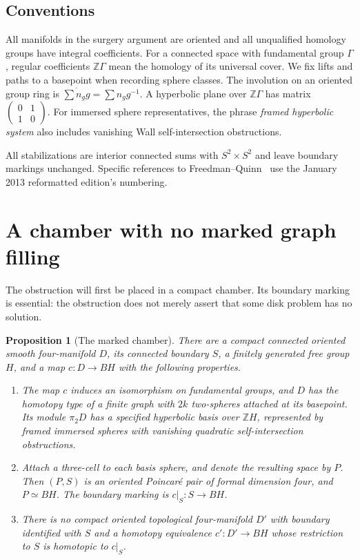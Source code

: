 \documentclass[11pt]{article}
\newtheorem{proposition}[theorem]{Proposition}
\theoremstyle{definition}
\theoremstyle{remark}
\newcommand{\Z}{\mathbb Z}
\begin{document}
\subsection{Conventions}
All manifolds in the surgery argument are oriented and all unqualified
homology groups have integral coefficients. For a connected space with
fundamental group $\Gamma$, regular coefficients $\Z\Gamma$ mean the
homology of its universal cover. We fix lifts and paths to a basepoint
when recording sphere classes. The involution on an oriented group ring
is $\overline{\sum n_g g}=\sum n_g g^{-1}$.
A hyperbolic plane over $\Z\Gamma$ has matrix
$\left(\begin{smallmatrix}0&1\\1&0\end{smallmatrix}\right)$.
For immersed sphere representatives, the phrase \emph{framed hyperbolic
system} also includes vanishing Wall self-intersection obstructions.

All stabilizations are interior connected sums with $S^2\times S^2$ and
leave boundary markings unchanged. Specific references to
Freedman--Quinn~\cite{FQ} use the January 2013 reformatted edition's
numbering.

\section{A chamber with no marked graph filling}
\label{ch:section}

The obstruction will first be placed in a compact chamber.  Its boundary
marking is essential: the obstruction does not merely assert that some
disk problem has no solution.

\begin{proposition}[The marked chamber]
\label{ch:chamber}
There are a compact connected oriented smooth four-manifold $D$, its
connected boundary $S$, a finitely generated free group $H$, and a map
$c:D\to BH$ with the following properties.
\begin{enumerate}
\item The map $c$ induces an isomorphism on fundamental groups, and $D$
has the homotopy type of a finite graph with $2k$ two-spheres attached
at its basepoint.  Its module $\pi_2D$ has a specified hyperbolic basis
over $\Z H$, represented by framed immersed spheres with vanishing
quadratic self-intersection obstructions.
\item Attach a three-cell to each basis sphere, and denote the resulting
space by $P$.  Then $(P,S)$ is an oriented Poincar\'e pair of formal
dimension four, and $P\simeq BH$.  The boundary marking is
$c|_S:S\to BH$.
\item There is no compact oriented topological four-manifold $D'$ with
boundary identified with $S$ and a homotopy equivalence $c':D'\to BH$
whose restriction to $S$ is homotopic to $c|_S$.
\end{enumerate}
\end{proposition}
\end{document}
